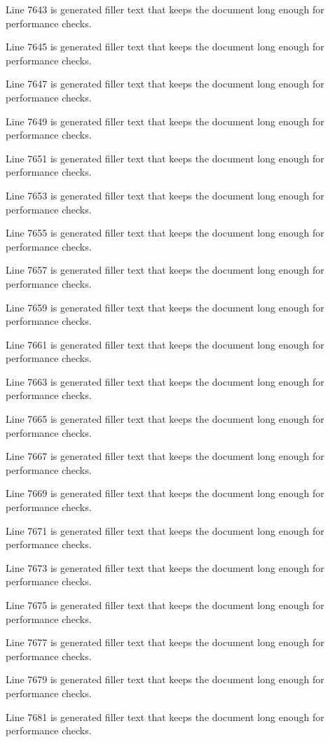 Line 7643 is generated filler text that keeps the document long enough for performance checks.

Line 7645 is generated filler text that keeps the document long enough for performance checks.

Line 7647 is generated filler text that keeps the document long enough for performance checks.

Line 7649 is generated filler text that keeps the document long enough for performance checks.

Line 7651 is generated filler text that keeps the document long enough for performance checks.

Line 7653 is generated filler text that keeps the document long enough for performance checks.

Line 7655 is generated filler text that keeps the document long enough for performance checks.

Line 7657 is generated filler text that keeps the document long enough for performance checks.

Line 7659 is generated filler text that keeps the document long enough for performance checks.

Line 7661 is generated filler text that keeps the document long enough for performance checks.

Line 7663 is generated filler text that keeps the document long enough for performance checks.

Line 7665 is generated filler text that keeps the document long enough for performance checks.

Line 7667 is generated filler text that keeps the document long enough for performance checks.

Line 7669 is generated filler text that keeps the document long enough for performance checks.

Line 7671 is generated filler text that keeps the document long enough for performance checks.

Line 7673 is generated filler text that keeps the document long enough for performance checks.

Line 7675 is generated filler text that keeps the document long enough for performance checks.

Line 7677 is generated filler text that keeps the document long enough for performance checks.

Line 7679 is generated filler text that keeps the document long enough for performance checks.

Line 7681 is generated filler text that keeps the document long enough for performance checks.

